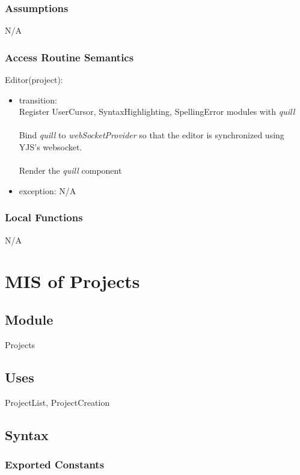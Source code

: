 \documentclass[12pt, titlepage]{article}
\begin{document}
	\subsubsection{Assumptions}
	N/A
	
	\subsubsection{Access Routine Semantics}
	
	\noindent Editor(project):
	\begin{itemize}
		\item transition: \\
		Register UserCursor, SyntaxHighlighting, SpellingError modules with \textit{quill} \\\\
		Bind \textit{quill} to \textit{webSocketProvider} so that the editor is synchronized using YJS's websocket.\\\\
		Render the \textit{quill} component
		\item exception: N/A
	\end{itemize}
	
	\subsubsection{Local Functions}
	
	N/A
	
	
	\newpage
	
	\section{MIS of Projects} \label{Module} 
	
	\subsection{Module}
	
	Projects
	
	\subsection{Uses}
	ProjectList, ProjectCreation
	
	\subsection{Syntax}
	
	\subsubsection{Exported Constants}
	
\end{document}
